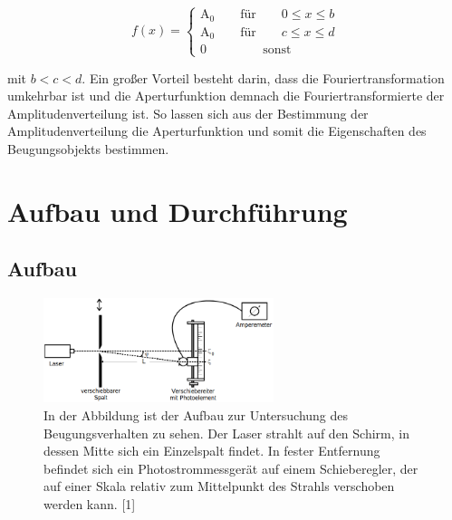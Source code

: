 \documentclass[titlepage = firstcover]{scrartcl}
\begin{document}
                    \begin{equation*}
                        f(x) =  \begin{cases}
                            \text{A}_0 \qquad \text{für} \qquad 0 \leqslant x \leqslant b \\
                            \text{A}_0 \qquad \text{für} \qquad c \leqslant x \leqslant d \\
                            0 \qquad \qquad \: \: \text{sonst}
                        \end{cases}
                    \end{equation*}

                    \noindent
                    mit $ b < c < d$. Ein großer Vorteil besteht darin, dass die Fouriertransformation umkehrbar ist und die Aperturfunktion demnach die Fouriertransformierte der Amplitudenverteilung
                    ist. So lassen sich aus der Bestimmung der Amplitudenverteilung die Aperturfunktion und somit die Eigenschaften des Beugungsobjekts bestimmen.

    
    \newpage
    \section{Aufbau und Durchführung}
        \subsection{Aufbau}
            \FloatBarrier

            \begin{figure}[h]
              \centering
              \includegraphics[width = 0.6\textwidth]{Bilder/Aufbau.png}
              \caption{In der Abbildung ist der Aufbau zur Untersuchung des Beugungsverhalten zu sehen. Der Laser strahlt auf den Schirm, in dessen Mitte sich ein Einzelspalt findet. In fester Entfernung befindet sich ein Photostrommessgerät auf einem Schieberegler, der auf einer Skala relativ zum Mittelpunkt des Strahls verschoben werden kann. [1]}
              \label{fig:Aufbau}
            \end{figure}
        
\end{document}
